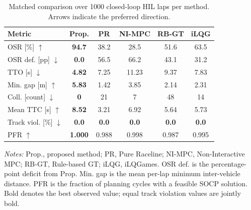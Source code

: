 \begin{table}[!tbp]
\centering
\footnotesize
\setlength{\tabcolsep}{2.3pt}
\renewcommand{\arraystretch}{1.08}
\caption{Matched comparison over 1000 closed-loop HIL laps per method. Arrows
indicate the preferred direction.}
\label{tab:comparison}
\begin{tabular}{@{}lccccc@{}}
\toprule
Metric & Prop. & PR & NI-MPC & RB-GT & iLQG \\
\midrule
OSR [\%] $\uparrow$             & \textbf{94.7} & 38.2 & 28.5 & 51.6 & 63.5 \\
OSR def. [pp] $\downarrow$      & \textbf{0.0} & 56.5 & 66.2 & 43.1 & 31.2 \\
TTO [s] $\downarrow$            & \textbf{4.82} & 7.25 & 11.23 & 9.37 & 7.83 \\
Min. gap [m] $\uparrow$         & \textbf{5.83} & 1.42 & 3.85 & 2.14 & 2.31 \\
Coll. [count] $\downarrow$      & \textbf{0} & 21 & 7 & 48 & 14 \\
Mean TTC [s] $\uparrow$         & \textbf{8.52} & 3.21 & 6.92 & 5.64 & 5.73 \\
Track viol. [\%] $\downarrow$  & \textbf{0.0} & \textbf{0.0} & \textbf{0.0} & \textbf{0.0} & \textbf{0.0} \\
PFR $\uparrow$                  & \textbf{1.000} & 0.988 & 0.998 & 0.987 & 0.995 \\
\bottomrule
\end{tabular}
\vspace{1mm}

\begin{minipage}{\columnwidth}
\scriptsize
\emph{Notes:} Prop., proposed method; PR, Pure Raceline; NI-MPC,
Non-Interactive MPC; RB-GT, Rule-based GT; iLQG, iLQGames. OSR def.
is the percentage-point deficit from Prop. Min. gap is the mean per-lap
minimum inter-vehicle distance. PFR is the fraction of planning cycles with a
feasible SOCP solution. Bold denotes the best observed value; equal track
violation values are jointly bold.
\end{minipage}
\end{table}

